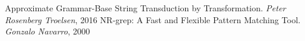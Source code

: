 \begin{thebibliography}{9}
 Approximate Grammar-Base String Transduction by
    Transformation. \textit{Peter Rosenberg Troelsen}, 2016
 NR-grep: A Fast and Flexible Pattern Matching Tool.
    \textit{Gonzalo Navarro}, 2000
\end{thebibliography}
